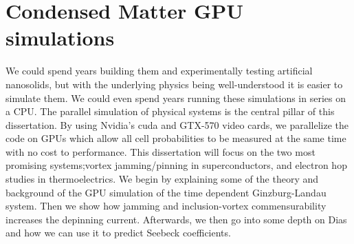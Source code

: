 \section{Condensed Matter GPU simulations}
 We could spend years building them and experimentally testing artificial nanosolids, but with the underlying physics being well-understood it is easier to simulate them.  We could even spend years running these simulations in series on a CPU. The parallel simulation of physical systems is the central pillar of this dissertation.  By using Nvidia's {\sc cuda} and GTX-570 video cards, we parallelize the code on GPUs which allow all cell probabilities to be measured at the same time with no cost to performance. This dissertation will focus on the two most promising systems;vortex jamming/pinning in superconductors, and electron hop studies in thermoelectrics. We begin by explaining some of the theory and background of the GPU simulation of the time dependent Ginzburg-Landau system. Then we show how jamming and inclusion-vortex commensurability increases the depinning current. Afterwards, we then go into some depth on Dias and how we can use it to predict Seebeck coefficients. 

